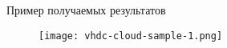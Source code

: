 \begin{frame}{Пример получаемых результатов}
\begin{figure}
    \centering
    \texttt{[image: vhdc-cloud-sample-1.png]}
\end{figure}
\end{frame}
